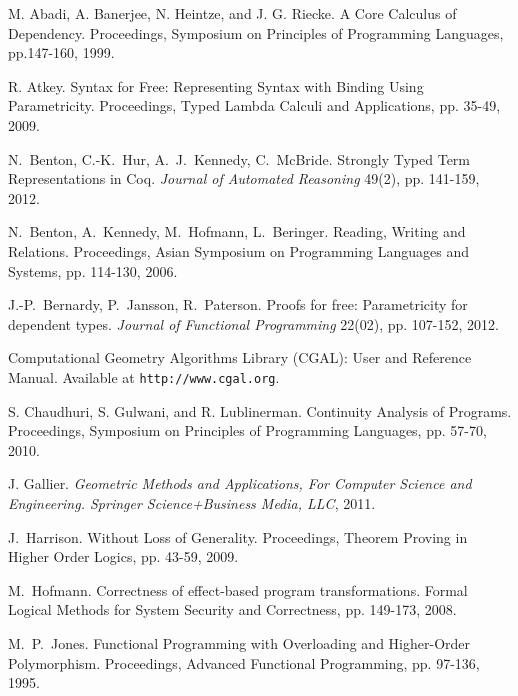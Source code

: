\documentclass[preprint]{sigplanconf}
\theoremstyle{examplestyle}
\theoremstyle{restatementstyle}
\begin{document}

\begin{thebibliography}{12}
\softraggedright

M. Abadi, A. Banerjee, N. Heintze, and J. G. Riecke. A Core Calculus
of Dependency. Proceedings, Symposium on Principles of Programming
Languages, pp.147-160, 1999.

R. Atkey.  Syntax for Free: Representing Syntax with Binding Using
Parametricity.  Proceedings, Typed Lambda Calculi and Applications,
pp. 35-49, 2009.

N.~Benton, C.-K.~Hur, A.~J.~Kennedy, C.~McBride.
Strongly Typed Term Representations in {Coq}.
{\em Journal of Automated Reasoning} 49(2), pp. 141-159, 2012.

N.~Benton, A.~Kennedy, M.~Hofmann, L.~Beringer.
Reading, Writing and Relations.
Proceedings, Asian Symposium on Programming Languages and Systems,
pp. 114-130, 2006.

J.-P.~Bernardy, P.~Jansson, R.~Paterson.
Proofs for free: Parametricity for dependent types.
{\em Journal of Functional Programming} 22(02), pp. 107-152, 2012.

Computational Geometry Algorithms Library (CGAL): User and Reference
Manual.  Available at {\tt http://www.cgal.org}.

S. Chaudhuri, S. Gulwani, and R. Lublinerman.  Continuity Analysis of
Programs.  Proceedings, Symposium on Principles of Programming
Languages, pp. 57-70, 2010.

J. Gallier. {\em Geometric Methods and Applications, For Computer
Science and Engineering. Springer Science+Business Media, LLC}, 2011.

J.~Harrison.
Without Loss of Generality.
Proceedings, Theorem Proving in Higher Order Logics,
pp. 43-59, 2009.

M.~Hofmann. Correctness of effect-based program
transformations. Formal Logical Methods for System Security and
Correctness, pp. 149-173, 2008.

M.~P.~Jones.  Functional Programming with Overloading and Higher-Order
Polymorphism. Proceedings, Advanced Functional Programming,
pp. 97-136, 1995.


\end{thebibliography}
\end{document}
